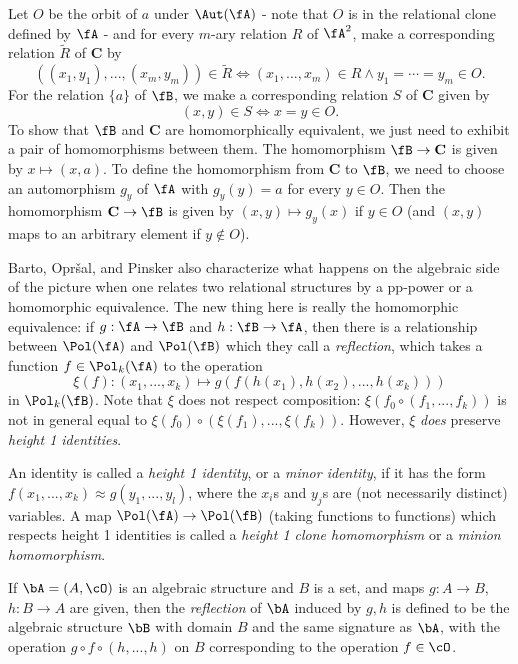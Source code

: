 Let $O$ be the orbit of $a$ under $\Aut(\fA)$ - note that $O$ is in the relational clone defined by $\fA$ - and for every $m$-ary relation $R$ of $\fA^2$, make a corresponding relation $\tilde{R}$ of $\mathbf{C}$ by
\[
((x_1,y_1), ..., (x_m,y_m)) \in \tilde{R} \iff (x_1, ..., x_m) \in R \wedge y_1 = \cdots = y_m \in O.
\]
For the relation $\{a\}$ of $\fB$, we make a corresponding relation $S$ of $\mathbf{C}$ given by
\[
(x,y) \in S \iff x = y \in O.
\]
To show that $\fB$ and $\mathbf{C}$ are homomorphically equivalent, we just need to exhibit a pair of homomorphisms between them. The homomorphism $\fB \rightarrow \mathbf{C}$ is given by $x \mapsto (x,a)$. To define the homomorphism from $\mathbf{C}$ to $\fB$, we need to choose an automorphism $g_y$ of $\fA$ with $g_y(y) = a$ for every $y \in O$. Then the homomorphism $\mathbf{C} \rightarrow \fB$ is given by $(x,y) \mapsto g_y(x)$ if $y \in O$ (and $(x,y)$ maps to an arbitrary element if $y \not\in O$).

Barto, Opr{\v{s}}al, and Pinsker \cite{barto-reflections} also characterize what happens on the algebraic side of the picture when one relates two relational structures by a pp-power or a homomorphic equivalence. The new thing here is really the homomorphic equivalence: if $g : \fA \rightarrow \fB$ and $h : \fB \rightarrow \fA$, then there is a relationship between $\Pol(\fA)$ and $\Pol(\fB)$ which they call a \emph{reflection}, which takes a function $f \in \Pol_k(\fA)$ to the operation
\[
\xi(f) : (x_1, ..., x_k) \mapsto g(f(h(x_1), h(x_2), ..., h(x_k)))
\]
in $\Pol_k(\fB)$. Note that $\xi$ does not respect composition: $\xi(f_0 \circ (f_1, ..., f_k))$ is not in general equal to $\xi(f_0)\circ (\xi(f_1), ..., \xi(f_k))$. However, $\xi$ \emph{does} preserve \emph{height 1 identities}.

\begin{defn} An identity is called a \emph{height 1 identity}, or a \emph{minor identity}, if it has the form $f(x_1, ..., x_k) \approx g(y_1, ..., y_l)$, where the $x_i$s and $y_j$s are (not necessarily distinct) variables. A map $\Pol(\fA) \rightarrow \Pol(\fB)$ (taking functions to functions) which respects height 1 identities is called a \emph{height 1 clone homomorphism} or a \emph{minion homomorphism}.
\end{defn}

\begin{defn} If $\bA = (A, \cO)$ is an algebraic structure and $B$ is a set, and maps $g : A \rightarrow B$, $h : B \rightarrow A$ are given, then the \emph{reflection} of $\bA$ induced by $g,h$ is defined to be the algebraic structure $\bB$ with domain $B$ and the same signature as $\bA$, with the operation $g\circ f \circ (h, ..., h)$ on $B$ corresponding to the operation $f \in \cO$.
\end{defn}

